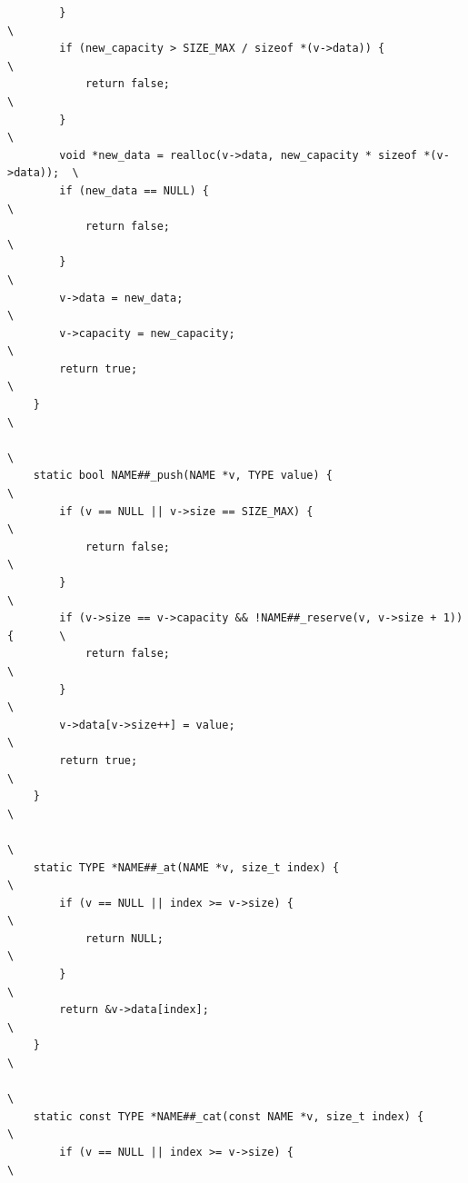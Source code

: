 \documentclass[11pt]{article}
\begin{document}
\begin{verbatim}
        }                                                                     \
        if (new_capacity > SIZE_MAX / sizeof *(v->data)) {                    \
            return false;                                                     \
        }                                                                     \
        void *new_data = realloc(v->data, new_capacity * sizeof *(v->data));  \
        if (new_data == NULL) {                                                \
            return false;                                                     \
        }                                                                     \
        v->data = new_data;                                                   \
        v->capacity = new_capacity;                                           \
        return true;                                                          \
    }                                                                         \
                                                                              \
    static bool NAME##_push(NAME *v, TYPE value) {                             \
        if (v == NULL || v->size == SIZE_MAX) {                                \
            return false;                                                     \
        }                                                                     \
        if (v->size == v->capacity && !NAME##_reserve(v, v->size + 1)) {       \
            return false;                                                     \
        }                                                                     \
        v->data[v->size++] = value;                                           \
        return true;                                                          \
    }                                                                         \
                                                                              \
    static TYPE *NAME##_at(NAME *v, size_t index) {                            \
        if (v == NULL || index >= v->size) {                                   \
            return NULL;                                                      \
        }                                                                     \
        return &v->data[index];                                               \
    }                                                                         \
                                                                              \
    static const TYPE *NAME##_cat(const NAME *v, size_t index) {               \
        if (v == NULL || index >= v->size) {                                   \

\end{verbatim}
\end{document}
